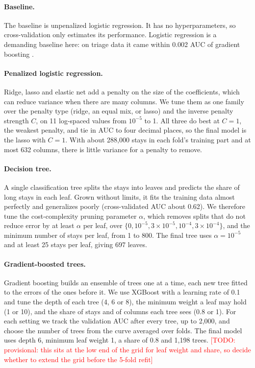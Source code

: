 \documentclass{article}
\newcommand{\todo}[1]{\textcolor{red}{[TODO: #1]}}
\begin{document}
\paragraph{Baseline.}
The baseline is unpenalized logistic regression. It has no hyperparameters,
so cross-validation only estimates its performance. Logistic regression is a
demanding baseline here: on triage data it came within 0.002 AUC of gradient
boosting \citep{zeleke2023}.

\paragraph{Penalized logistic regression.}
Ridge, lasso and elastic net add a penalty on the size of the coefficients,
which can reduce variance when there are many columns. We tune them as one
family over the penalty type (ridge, an equal mix, or lasso) and the inverse
penalty strength $C$, on 11 log-spaced values from $10^{-5}$ to 1. All three
do best at $C = 1$, the weakest penalty, and tie in AUC to four decimal places,
so the final model is the lasso with $C = 1$. With about 288{,}000 stays in
each fold's training part and at most 632 columns, there is little variance
for a penalty to remove.

\paragraph{Decision tree.}
A single classification tree splits the stays into leaves and predicts the
share of long stays in each leaf. Grown without limits, it fits the training
data almost perfectly and generalizes poorly (cross-validated AUC about
0.62). We therefore tune the cost-complexity pruning parameter $\alpha$, which
removes splits that do not reduce error by at least $\alpha$ per leaf, over
$\{0, 10^{-5}, 3{\times}10^{-5}, 10^{-4}, 3{\times}10^{-4}\}$, and the minimum
number of stays per leaf, from 1 to 800. The final tree uses $\alpha =
10^{-5}$ and at least 25 stays per leaf, giving 697 leaves.

\paragraph{Gradient-boosted trees.}
Gradient boosting builds an ensemble of trees one at a time, each new tree
fitted to the errors of the ones before it. We use XGBoost with a learning rate
of 0.1 and tune the depth of each tree (4, 6 or 8), the minimum weight a leaf
may hold (1 or 10), and the share of stays and of columns each tree sees (0.8
or 1). For each setting we track the validation AUC after every tree, up to
2{,}000, and choose the number of trees from the curve averaged over folds.
The final model uses depth 6, minimum leaf weight 1, a share of 0.8 and 1{,}198
trees. \todo{provisional: this sits at the low end of the grid for leaf weight
and share, so decide whether to extend the grid before the 5-fold refit}
\end{document}
